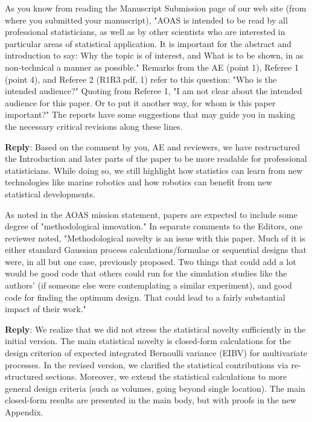 \documentclass[a4paper]{article}
\newcounter{reviewer}
\def\reply{\textbf{Reply}}
\begin{document}
\vspace{5mm}

As you know from reading the Manuscript Submission page of our
web site (from where you submitted your manuscript), "AOAS is 
intended to be read by all professional statisticians, as well 
as by other scientists who are interested in particular areas 
of statistical application. It is important for the abstract
and introduction to say: Why the topic is of interest, and What 
is to be shown, in as non-technical a manner as possible."
Remarks from the AE (point 1), Referee 1 (point 4), and Referee 2 
(R1R3.pdf, 1) refer to this question: "Who is the intended
audience?"  Quoting from Referee 1, "I am not clear about the 
intended audience for this paper.  Or to put it another way, 
for whom is this paper important?" The reports have some 
suggestions that may guide you in making the necessary critical 
revisions along these lines.  

\reply: Based on the comment by you, AE and reviewers, we have restructured the Introduction and later parts of the paper to be more readable for professional statisticians. While doing so, we still highlight how statistics can learn from new technologies like marine robotics and how robotics can benefit from new statistical developments. 

\vspace{5mm}

As noted in the AOAS mission statement, papers are expected
to include some degree of "methodological innovation."
In separate comments to the Editors, one reviewer noted,
"Methodological novelty is an issue with this paper.  Much of 
it is either standard Gaussian process calculations/formulae 
or sequential designs that were, in all but one case, previously 
proposed. Two things that could add a lot would be good code 
that others could run for the simulation studies like the authors' 
(if someone else were contemplating a similar experiment), and 
good code for finding the optimum design. That could lead to a 
fairly substantial impact of their work."

\reply: We realize that we did not stress the statistical novelty sufficiently in the initial version. The main statistical novelty is closed-form calculations for the design criterion of expected integrated Bernoulli variance (EIBV) for multivariate processes. In the revised version, we clarified the statistical contributions via re-structured sections. Moreover, we extend the statistical calculations to more general design criteria (such as volumes, going beyond single location). The main closed-form results are presented in the main body, but with proofs in the new Appendix.
\end{document}
